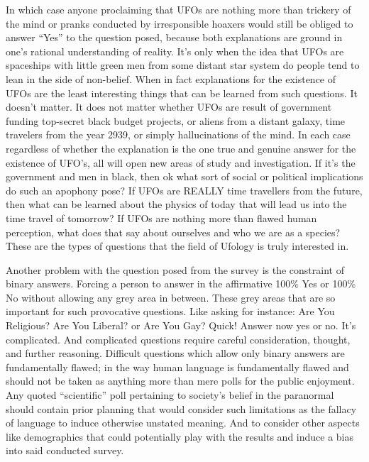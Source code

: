 In which case anyone proclaiming that UFOs are nothing more than trickery of the
mind or pranks conducted by irresponsible hoaxers would still be obliged to
answer ``Yes'' to the question posed, because both explanations are ground in
one's rational understanding of reality. It's only when the idea that UFOs are
spaceships with little green men from some distant star system do people tend to
lean in the side of non-belief. When in fact explanations for the existence of
UFOs are the least interesting things that can be learned from such questions.
It doesn't matter. It does not matter whether UFOs are result of government
funding top-secret black budget projects, or aliens from a distant galaxy, time
travelers from the year 2939, or simply hallucinations of the mind. In each case
regardless of whether the explanation is the one true and genuine answer for the
existence of UFO's, all will open new areas of study and investigation. If it's the government and men in black, then ok what
sort of social or political implications do such an apophony pose? If UFOs are
REALLY time travellers from the future, then what can be learned about the physics
of today that will lead us into the time travel of tomorrow? If UFOs are nothing
more than flawed human perception, what does that say about ourselves and who we
are as a species? These are the types of questions that the field of Ufology is
truly interested in.

Another problem with the question posed from the survey is the constraint of
binary answers. Forcing a person to answer in the affirmative 100\% Yes or
100\% No without allowing any grey area in between. These grey areas that are so
important for such provocative questions. Like asking for instance: Are You
Religious? Are You Liberal? or Are You Gay? Quick! Answer now yes or no. It's
complicated. And complicated questions require careful consideration, thought,
and further reasoning. Difficult questions which allow only binary answers are
fundamentally flawed; in the way human language is fundamentally flawed and
should not be taken as anything more than mere polls for the public enjoyment.
Any quoted ``scientific'' poll pertaining to society's belief in the paranormal
should contain prior planning that would consider such limitations as the fallacy
of language to induce otherwise unstated meaning. And to consider other aspects
like demographics that could potentially play with the results and induce a bias
into said conducted survey.

